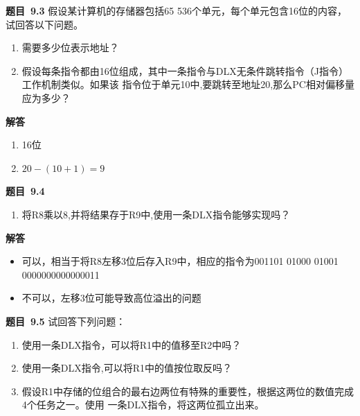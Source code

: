 \documentclass[10pt,a4paper,UTF8]{ctexart}
\newcommand{\problemname}{待定义}
\newenvironment{problem}{\begin{shaded}\par\noindent\textbf{题目\  \problemname}}{\end{shaded}\par}
\newenvironment{solution}{\par\noindent\textbf{解答}\ }{\par}
\begin{document}
\renewcommand{\problemname}{9.3}
\begin{problem}
	假设某计算机的存储器包括65 536个单元，每个单元包含16位的内容，试回答以下问题。
	\begin{enumerate}[(1)]
		\item 需要多少位表示地址？
		\item 假设每条指令都由16位组成，其中一条指令与DLX无条件跳转指令（J指令）工作机制类似。如果该
		指令位于单元10中,要跳转至地址20,那么PC相对偏移量应为多少？
	\end{enumerate}

\end{problem}

\begin{solution}
	\begin{enumerate}[(1)]
		\item 16位
		\item $20-(10+1)=9$
	\end{enumerate}
\end{solution}


\renewcommand{\problemname}{9.4}
\begin{problem}
	\begin{enumerate}[(1)]
		\item 将R8乘以8,并将结果存于R9中,使用一条DLX指令能够实现吗？
	\end{enumerate}

\end{problem}

\begin{solution}
	\begin{itemize}
		\item 可以，相当于将R8左移3位后存入R9中，相应的指令为001101 01000 01001 0000000000000011
		\item 不可以，左移3位可能导致高位溢出的问题
	\end{itemize}

\end{solution}


\renewcommand{\problemname}{9.5}
\begin{problem}
	试回答下列问题：
	\begin{enumerate}[(1)]
		\item 使用一条DLX指令，可以将R1中的值移至R2中吗？
		\item 使用一条DLX指令,可以将R1中的值按位取反吗？
		\item 假设R1中存储的位组合的最右边两位有特殊的重要性，根据这两位的数值完成4个任务之一。使用
		一条DLX指令，将这两位孤立出来。
	\end{enumerate}

\end{problem}
\end{document}
